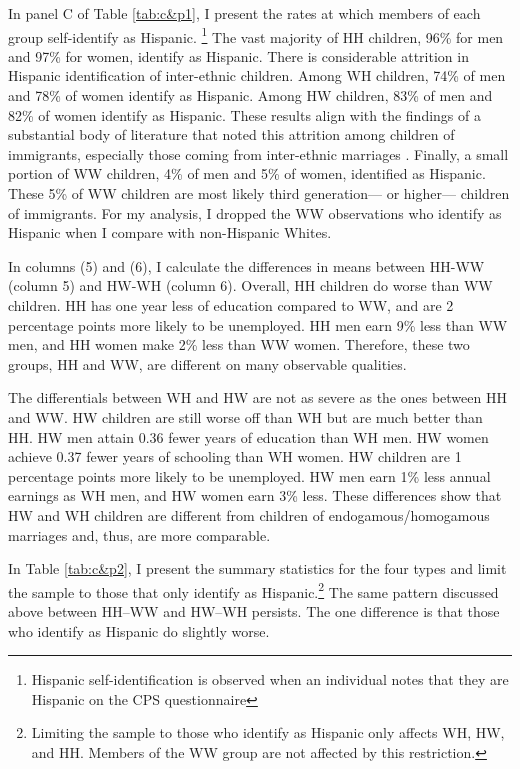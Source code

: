 \documentclass[a4paper,fleqn]{cas-sc}
\begin{document}
In panel C of Table \ref{tab:c&p1}, I present the rates at which members of each group self-identify as Hispanic. \footnote{Hispanic self-identification is observed when an individual notes that they are Hispanic on the CPS questionnaire} The vast majority of HH children, 96\% for men and 97\% for women, identify as Hispanic. There is considerable attrition in Hispanic identification of inter-ethnic children. Among WH children, 74\% of men and 78\% of women identify as Hispanic. Among HW children, 83\% of men and 82\% of women identify as Hispanic. These results align with the findings of a substantial body of literature that noted this attrition among children of immigrants, especially those coming from inter-ethnic marriages \citep{duncan2017complexity, duncan2018identifying, duncan2020new, antman2020ethnic}. Finally, a small portion of WW children, 4\% of men and 5\% of women, identified as Hispanic. These 5\% of WW children are most likely third generation--- or higher--- children of immigrants. For my analysis, I dropped the WW observations who identify as Hispanic when I compare with non-Hispanic Whites.

In columns (5) and (6), I calculate the differences in means between HH-WW (column 5) and HW-WH (column 6). Overall, HH children do worse than WW children. HH has one year less of education compared to WW, and are 2 percentage points more likely to be unemployed. HH men earn 9\% less than WW men, and HH women make 2\% less than WW women. Therefore, these two groups, HH and WW, are different on many observable qualities.

The differentials between WH and HW are not as severe as the ones between HH and WW. HW children are still worse off than WH but are much better than HH. HW men attain 0.36 fewer years of education than WH men. HW women achieve 0.37 fewer years of schooling than WH women. HW children are 1 percentage points more likely to be unemployed. HW men earn 1\% less annual earnings as WH men, and HW women earn 3\% less. These differences show that HW and WH children are different from children of endogamous/homogamous marriages and, thus, are more comparable.

In Table \ref{tab:c&p2}, I present the summary statistics for the four types and limit the sample to those that only identify as Hispanic.\footnote{Limiting the sample to those who identify as Hispanic only affects WH, HW, and HH. Members of the WW group are not affected by this restriction.} The same pattern discussed above between HH--WW and HW--WH persists. The one difference is that those who identify as Hispanic do slightly worse.
\end{document}
